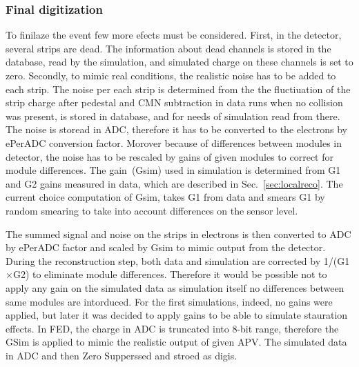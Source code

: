 
\subsubsection{Final digitization}

To finilaze the event few more efects must be considered. First, in the detector, several strips are dead. The information about dead channels is stored in the database, read by the simulation, and simulated charge on these channels is set to zero. Secondly, to mimic real conditions, the realistic noise has to be added to each strip. The noise per each strip is determined from the the fluctiuation of the strip charge after pedestal and CMN subtraction in data runs when no collision was present, is stored in database, and for needs of simulation read from there. The noise is storead in ADC, therefore it has to be converted to the electrons by ePerADC conversion factor. Morover because of differences between modules in detector, the noise has to be rescaled by gains of given modules to correct for module differences. The gain~(Gsim) used in simulation is determined from G1 and G2 gains measured in data, which are described in Sec.~\ref{sec:localreco}. The current choice computation of Gsim, takes G1 from data and smears G1 by random smearing to take into account differences on the sensor level.

 The summed signal and noise on the strips in electrons is then converted to ADC by ePerADC factor and scaled by Gsim to mimic output from the detector. During the reconstruction step, both data and simulation are corrected by 1/(G1$\times$G2) to eliminate module differences. Therefore it would be possible not to apply any gain on the simulated data as simulation itself no differences between same modules are intorduced. For the first simulations, indeed, no gains were applied, but later it was decided to apply gains to be able to simulate stauration effects. In FED, the charge in ADC is truncated into 8-bit range, therefore the GSim is applied to mimic the realistic output of given APV. The simulated data in ADC and then Zero Supperssed and stroed as digis.
 

